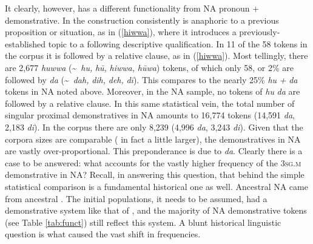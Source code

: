 \documentclass[output=paper]{langsci/langscibook}
\begin{document}
It clearly, however, has a different functionality from NA pronoun + demonstrative. In  the construction consistently is anaphoric to a previous proposition or situation, as in (\ref{hiwwa}), where it introduces a previously-established topic to a following descriptive qualification. In 11 of the 58 tokens in the  corpus it is followed by a {relative} clause, as in (\ref{hiwwa}). Most tellingly, there are 2,677 \textit{huwwa} ({\textasciitilde}~\textit{hu,} \textit{hū,} \textit{hiwwa,} \textit{hūwa}) tokens, of which only 58, or 2\% are followed by \textit{da} ({\textasciitilde}~\textit{dah,} \textit{dih,} \textit{deh,} \textit{dī}). This compares to the nearly 25\% \textit{hu} \textit{+} \textit{da} tokens in NA noted above. Moreover, in the NA sample, no tokens of \textit{hu} \textit{da} are followed by a {relative} clause. In this same statistical vein, the total number of singular proximal {demonstratives} in NA amounts to 16,774 tokens (14,591 \textit{da}, 2,183 \textit{di}). In the  corpus there are only 8,239 (4,996 \textit{da}, 3,243 \textit{di}). Given that the corpora sizes are comparable ( in fact a little larger), the {demonstratives} in NA are vastly over-proportional. This preponderance is due to \textit{da}. Clearly there is a case to be answered: what accounts for the vastly higher {frequency} of the 3\textsc{sg.m} demonstrative in NA? Recall, in answering this question, that behind the simple statistical comparison is a fundamental historical one as well. Ancestral NA came from ancestral . The initial populations, it needs to be assumed, had a demonstrative system like that of , and the majority of NA demonstrative tokens (see Table \ref{tab:funct}) still reflect this system. A blunt historical linguistic question is what caused the vast shift in frequencies.
\end{document}
